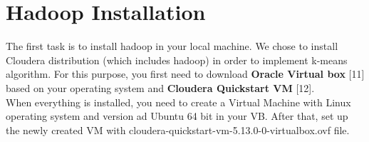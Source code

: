 
\chapter{Hadoop Installation} %

\label{Chapter1} %

The first task is to install hadoop in your local machine. We chose to install Cloudera distribution (which includes hadoop) in order to implement k-means algorithm. For this purpose, you first need to download \textbf{Oracle Virtual box} [11] based on your operating system and \textbf{Cloudera Quickstart VM} [12].\\
When everything is installed, you need to create a Virtual Machine with Linux operating system and version ad Ubuntu 64 bit in your VB. After that, set up the newly created VM with cloudera-quickstart-vm-5.13.0-0-virtualbox.ovf
file.
